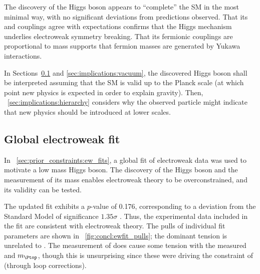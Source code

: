 
The discovery of the Higgs boson appears to ``complete'' the SM in the most minimal way, 
with no significant deviations from predictions observed. That its 
\HepProcess{\PHiggs\PW\PW} and \HepProcess{\PHiggs\PZ\PZ} couplings agree with 
expectations confirms that the Higgs mechanism underlies electroweak symmetry breaking. 
That its fermionic couplings are proportional to mass supports that fermion masses are 
generated by Yukawa interactions.

In Sections~\ref{sec:implications:ewfit} and \ref{sec:implications:vacuum}, the 
discovered Higgs boson shall be interpreted assuming that the SM is valid up to the 
Planck scale (at which point new physics is expected in order to explain gravity). Then, 
\Section~\ref{sec:implications:hierarchy} considers why the observed particle might 
indicate that new physics should be introduced at lower scales.



\subsection{Global electroweak fit}
\label{sec:implications:ewfit}

In \Section~\ref{sec:prior_constraints:ew_fits}, a global fit of electroweak data was 
used to motivate a low mass Higgs boson. The discovery of the Higgs boson and the 
measurement of its mass enables electroweak theory to be overconstrained, and its 
validity can be tested. 

The updated fit exhibits a $p$-value of 0.176, corresponding to a deviation from the 
Standard Model of significance $1.35\sigma$ \cite{Gfitter:2013}. Thus, the experimental 
data included in the fit are consistent with electroweak theory. The pulls of individual 
fit parameters are shown in \Figure~\ref{fig:concl:ewfit_pulls}; the dominant tension is 
unrelated to \mH. The measurement of \mH does cause some tension with the measured \mW 
and $m_{\Ptop}$, though this is unsurprising since these were driving the constraint of 
\mH (through loop corrections).

